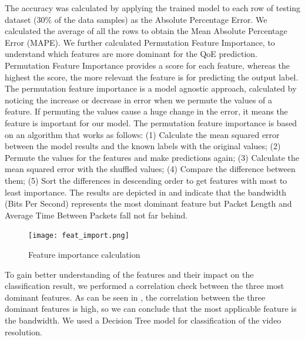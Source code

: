 The accuracy was calculated by applying the trained model to each row of testing dataset (30\% of the data samples) as the Absolute Percentage Error. We calculated the average of all the rows to obtain the Mean Absolute Percentage Error (MAPE). We further calculated Permutation Feature Importance, to understand which features are more dominant for the QoE prediction. Permutation Feature Importance provides a score for each feature, whereas the highest the score, the more relevant the feature is for predicting the output label. The permutation feature importance is a model agnostic approach, calculated by noticing the increase or decrease in error when we permute the values of a feature. If permuting the values cause a huge change in the error, it means the feature is important for our model. The permutation feature importance is based on an algorithm that works as follows: (1) Calculate the mean squared error between the model results and the known labels with the original values; (2) Permute the values for the features and make predictions again; (3) Calculate the mean squared error with the shuffled values; (4) Compare the difference between them; (5)	Sort the differences in descending order to get features with most to least importance.
The results are depicted in  and indicate that the bandwidth (Bits Per Second) represents the most dominant feature but Packet Length and Average Time Between Packets fall not far behind.

\begin{figure}
    \centering
    \texttt{[image: feat\_import.png]}
    \caption{Feature importance calculation}
    \label{fig:feat-import}
\end{figure}

To gain better understanding of the features and their impact on the classification result, we performed a correlation check between the three most dominant features. As can be seen in , the correlation between the three dominant features is high, so we can conclude that the most applicable feature is the bandwidth. We used a Decision Tree model for classification of the video resolution. 


